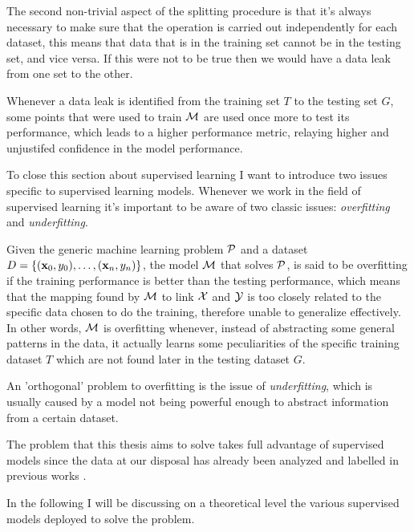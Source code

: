 \medskip

The second non-trivial aspect of the splitting procedure is that it's always necessary to make sure
that the operation is carried out independently for each dataset, this means that data that is in the
training set cannot be in the testing set, and vice versa. If this were not to be true then we would
have a data leak from one set to the other.

\smallskip

Whenever a data leak is identified from the training set $T$ to the testing set $G$, some points
that were used to train $\mathcal{M}$ are used once more to test its performance, which leads to a higher
performance metric, relaying higher and unjustifed confidence in the model performance.

\medskip

To close this section about supervised learning I want to introduce two issues specific to
supervised learning models. Whenever we work in the field of supervised learning it's important to be aware of two classic issues: \emph{overfitting} and \emph{underfitting}.

\smallskip

Given the generic machine learning problem $\mathcal{P}$ and a dataset $D = \{(\mathbf{x}_0, y_0), \ldots, (\mathbf{x}_n, y_n)\}$, the model $\mathcal{M}$ that
solves $\mathcal{P}$, is said to be overfitting if the training performance is better
than the testing performance, which means that the mapping found by $\mathcal{M}$ to link $\mathcal{X}$
and $\mathcal{Y}$ is too closely related to the specific data chosen to do the training, therefore
unable to generalize effectively. In other
words, $\mathcal{M}$ is overfitting whenever, instead of abstracting some general patterns in the
data, it actually learns some peculiarities of the specific training dataset $T$ \cite{ZhouZhi-Hua2021ML}
which are not found later in the testing dataset $G$.

\smallskip

An 'orthogonal' problem to overfitting is the issue of \emph{underfitting}, which is usually caused
by a model not being powerful enough to abstract information from a certain dataset.

\medskip

The problem that this thesis aims to solve takes full advantage of supervised models since the data at our
disposal has already been analyzed and labelled in previous works \cite{mariotto2022}\cite{mariotto2022-generic}.

\medskip

In the following I will be discussing on a theoretical level the various supervised models deployed
to solve the problem.

